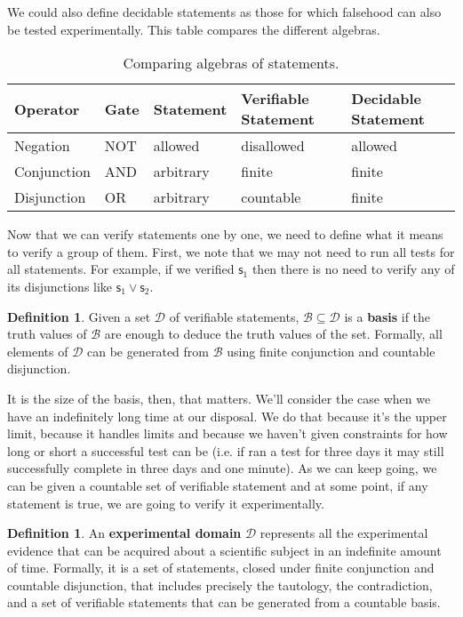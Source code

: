 \documentclass[letterpaper]{article}
\theoremstyle{plain}%
\theoremstyle{definition}
\newtheorem{defn}[thrm]{Definition}
\theoremstyle{remark}
\def\OR{\vee}
\newcommand{\stmt}[1][s] {\mathsf{#1}}
\newcommand{\edomain}[1][D] {\mathcal{#1}}
\newcommand{\basis}[1][B] {\mathcal{#1}} %
\begin{document}
We could also define decidable statements as those for which falsehood can also be tested experimentally. This table compares the different algebras.

\begin{table}[h]
	\centering
	\begin{tabular}{p{} p{} p{} p{} p{}}
		Operator & Gate & Statement & Verifiable Statement & Decidable Statement  \\ 
		\hline 
		Negation & NOT & allowed & disallowed & allowed \\ 
		Conjunction & AND & arbitrary  & finite & finite \\ 
		Disjunction & OR & arbitrary  & countable & finite \\ 
	\end{tabular}
	\caption{Comparing algebras of statements.}
\end{table}

Now that we can verify statements one by one, we need to define what it means to verify a group of them. First, we note that we may not need to run all tests for all statements. For example, if we verified $\stmt_1$ then there is no need to verify any of its disjunctions like $\stmt_1 \OR \stmt_2$.

\begin{defn}
	Given a set $\edomain$ of verifiable statements, $\basis \subseteq \edomain$ is a \textbf{basis} if the truth values of $\basis$ are enough to deduce the truth values of the set. Formally, all elements of $\edomain$ can be generated from $\basis$ using finite conjunction and countable disjunction.
\end{defn}

It is the size of the basis, then, that matters. We'll consider the case when we have an indefinitely long time at our disposal. We do that because it's the upper limit, because it handles limits and because we haven't given constraints for how long or short a successful test can be (i.e. if ran a test for three days it may still successfully complete in three days and one minute). As we can keep going, we can be given a countable set of verifiable statement and at some point, if any statement is true, we are going to verify it experimentally.

\begin{defn}
	An \textbf{experimental domain} $\edomain$ represents all the experimental evidence that can be acquired about a scientific subject in an indefinite amount of time. Formally, it is a set of statements, closed under finite conjunction and countable disjunction, that includes precisely the tautology, the contradiction, and a set of verifiable statements that can be generated from a countable basis.
\end{defn}
\end{document}
